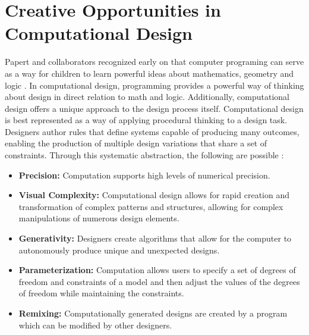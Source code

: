\documentclass{sigchi}
\begin{document}
\section{Creative Opportunities in Computational Design}
Papert and collaborators recognized early on that computer programing can serve as a way for children to learn powerful ideas about mathematics, geometry and logic \cite{mindstorms}. In computational design, programming provides a powerful way of thinking about design in direct relation to math and logic. Additionally, computational design offers a unique approach to the design process itself. Computational design is best represented as a way of applying procedural thinking to a design task. Designers author rules that define systems capable of producing many outcomes, enabling the production of  multiple design variations that share a set of constraints. Through this systematic abstraction, the following are possible \cite{reas}:
\begin{itemize}
\item \textbf{Precision:} Computation supports high levels of numerical precision.
\vspace{-8pt}
\item \textbf{Visual Complexity:} Computational design allows for rapid creation and transformation of complex patterns and structures, allowing for complex manipulations of numerous design elements.
\vspace{-6pt}
\item \textbf{Generativity:} Designers create algorithms that allow for the computer to autonomously produce unique and unexpected designs.
\vspace{-6pt}
\item \textbf{Parameterization:} Computation allows users to specify a set of degrees of freedom and constraints of a model and then adjust the values of the degrees of freedom while maintaining the constraints.
\vspace{-6pt}
\item \textbf{Remixing:} Computationally generated designs are created by a program which can be modified by other designers. 
\end{itemize} 
\end{document}
